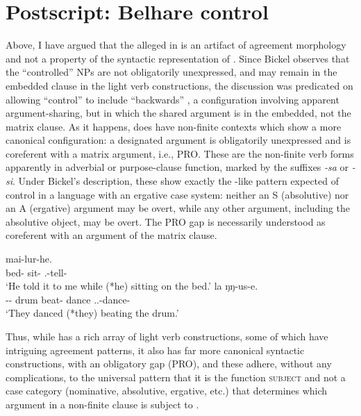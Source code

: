 \documentclass[output=paper]{langsci/langscibook}
\begin{document}
\section{Postscript: Belhare control}

Above, I have argued that the alleged  in  
is an artifact of agreement morphology and not a property of the syntactic
representation of . Since Bickel observes that the \enquote{controlled}
NPs are not obligatorily unexpressed, and may remain in the embedded clause in
the light verb constructions, the discussion was predicated on allowing
\enquote{control} to include \enquote{backwards} , a configuration
involving apparent argument-sharing, but in which the shared argument is in the
embedded, not the matrix clause. As it happens,  does have non-finite
contexts which show a more canonical  configuration: a designated
argument is obligatorily unexpressed and is coreferent with a matrix argument,
i.e., PRO. These are the non-finite verb forms apparently in adverbial or
purpose-clause function, marked by the suffixes \emph{-sa} or \emph{-si}. Under
Bickel's description, these show  exactly the -like pattern expected of
control in a language with an ergative case system: neither an S (absolutive)
nor an A (ergative) argument may be overt, while any other argument, including
the absolutive object, may be overt. The PRO gap is necessarily understood as
coreferent with an argument of the matrix clause.

\ea \begin{xlista}
	\ex {} mai-lur-he.\\
    {} \hphantom{*(}\Third{} bed-\Loc{} sit-\Ss{} {} \Fsg.\Uu{}-tell-\Pst{} \\
		\glt `He told it to me while (*he) sitting on the bed.'
	\ex {} la ŋŋ-us-e.\\
    {} \hphantom{*(}\Third{}-\Nsg{}-\Erg{} drum beat-\Ss{} {} dance \Third.\Nsg{}.\Su{}-dance-\Pst{} \\
		\glt `They danced (*they) beating the drum.' \citep[147]{bickel04}
	\end{xlista}
\z

Thus, while  has a rich array of light verb constructions, some of
which have intriguing agreement patterns, it also has far more canonical
syntactic  constructions, with an obligatory gap (PRO), and these
adhere, without any complications, to the universal pattern that it is the
function \textsc{subject} and not a case category (nominative, absolutive,
ergative, etc.) that determines which argument in a non-finite clause is
subject to .
\end{document}
